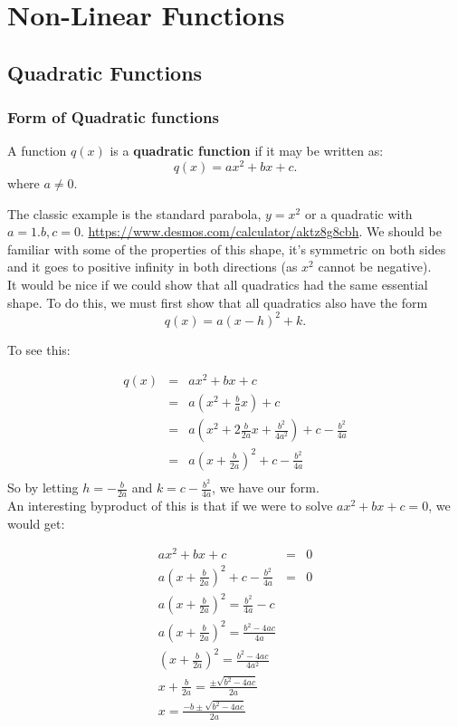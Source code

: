 
\chapter{Non-Linear Functions}\label{Chapter:NonLinear}


\section{Quadratic Functions}\label{Section:Quadratics}



\subsection{Form of Quadratic functions}

\begin{definition}
A function $q(x)$ is a \textbf{ quadratic function} if it may be written as: $$q(x)=ax^2+bx+c.$$ where $a\neq0$.
\end{definition}

The classic example is the standard parabola,  $y=x^2$ or a quadratic with $a=1. b,c=0$.  \url{https://www.desmos.com/calculator/aktz8g8cbh}.  We should be familiar with some of the properties of this shape, it's symmetric on both sides and it goes to positive  infinity in both directions (as $x^2$ cannot be negative).\\

It would be nice if we could show that all quadratics had the same essential shape.  To do this, we must first show that all quadratics also have the form $$q(x)=a(x-h)^2+k.$$

To see this:

\begin{eqnarray*}
q(x)&=&ax^2+bx+c\\
&=&a(x^2+\frac{b}{a}x)+c\\
&=&a(x^2+2\frac{b}{2a}x+\frac{b^2}{4a^2})+c-\frac{b^2}{4a}\\
&=&a(x+\frac{b}{2a})^2+c-\frac{b^2}{4a}\\
\end{eqnarray*}
So by letting $h=-\frac{b}{2a}$ and $k=c-\frac{b^2}{4a}$, we have our form.\\

An interesting byproduct of this is that if we were to solve $ax^2+bx+c=0$, we would get:

\begin{eqnarray*}
ax^2+bx+c&=&0\\
a(x+\frac{b}{2a})^2+c-\frac{b^2}{4a}&=&0\\
a(x+\frac{b}{2a})^2=\frac{b^2}{4a}-c\\
a(x+\frac{b}{2a})^2=\frac{b^2-4ac}{4a}\\
(x+\frac{b}{2a})^2=\frac{b^2-4ac}{4a^2}\\
x+\frac{b}{2a}=\frac{\pm\sqrt{b^2-4ac}}{2a}\\
x=\frac{-b\pm\sqrt{b^2-4ac}}{2a}\\
\end{eqnarray*}

